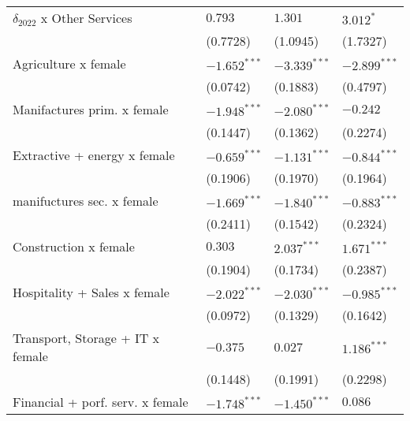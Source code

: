 \begin{tabular}{llll}
$\delta_{2022}$ x Other Services                   &            $0.793$ &            $1.301$ &          $3.012^*$ \\
                                                   &           (0.7728) &           (1.0945) &           (1.7327) \\
Agriculture x female                               &     $-1.652^{***}$ &     $-3.339^{***}$ &     $-2.899^{***}$ \\
                                                   &           (0.0742) &           (0.1883) &           (0.4797) \\
Manifactures prim. x female                        &     $-1.948^{***}$ &     $-2.080^{***}$ &           $-0.242$ \\
                                                   &           (0.1447) &           (0.1362) &           (0.2274) \\
Extractive + energy x female                       &     $-0.659^{***}$ &     $-1.131^{***}$ &     $-0.844^{***}$ \\
                                                   &           (0.1906) &           (0.1970) &           (0.1964) \\
manifuctures sec. x female                         &     $-1.669^{***}$ &     $-1.840^{***}$ &     $-0.883^{***}$ \\
                                                   &           (0.2411) &           (0.1542) &           (0.2324) \\
Construction x female                              &            $0.303$ &      $2.037^{***}$ &      $1.671^{***}$ \\
                                                   &           (0.1904) &           (0.1734) &           (0.2387) \\
Hospitality + Sales x female                       &     $-2.022^{***}$ &     $-2.030^{***}$ &     $-0.985^{***}$ \\
                                                   &           (0.0972) &           (0.1329) &           (0.1642) \\
Transport, Storage + IT x female                   &           $-0.375$ &            $0.027$ &      $1.186^{***}$ \\
                                                   &           (0.1448) &           (0.1991) &           (0.2298) \\
Financial + porf. serv. x female                   &     $-1.748^{***}$ &     $-1.450^{***}$ &            $0.086$ \\

\end{tabular}
